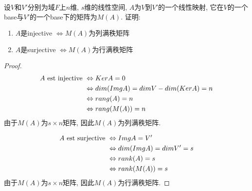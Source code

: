 \documentclass{book}
\begin{document}
\begin{example}
设$V$和$V'$分别为域$F$上$n$维, $s$维的线性空间, $A$为$V$到$V'$的一个线性映射, 它在$V$的一个base与$V'$的一个base下的矩阵为$M(A)$.
证明:
\begin{enumerate}
\item $A$是injective $\Leftrightarrow M(A)$为列满秩矩阵
\item $A$是surjective $\Leftrightarrow M(A)$为行满秩矩阵
\end{enumerate}
\end{example}
\begin{proof}
$$
\begin{aligned}
A \text{ est injective } & \Leftrightarrow Ker A = 0 \\
& \Leftrightarrow dim(Img A) = dim V - dim(Ker A) = n \\
& \Leftrightarrow rang(A) = n \\
& \Leftrightarrow rang(M(A)) = n
\end{aligned}
$$
由于$M(A)$为$s \times n$矩阵, 因此$M(A)$为列满秩矩阵.

$$
\begin{aligned}
A \text{ est surjective } & \Leftrightarrow Img A = V' \\
& \Leftrightarrow dim(Img A) = dim V' = s \\
& \Leftrightarrow rank(A) = s \\
& \Leftrightarrow rank(M(A)) = s \\
\end{aligned}
$$
由于$M(A)$为$s \times n$矩阵, 因此$M(A)$为行满秩矩阵.
\end{proof}
\end{document}
